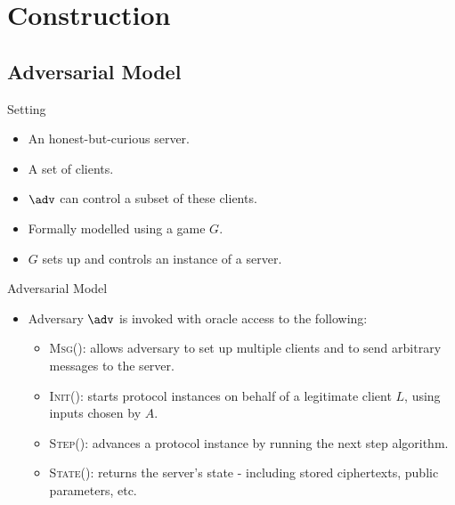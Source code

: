 \documentclass{beamer}
\begin{document}
\section{Construction}
\subsection{Adversarial Model}
\begin{frame}{Setting}
	\begin{itemize}
		\setlength\itemsep{1em}
		\item An honest-but-curious server.
		\item A set of clients.
		\item $\adv$ can control a subset of these clients.
		\item Formally modelled using a game $G$.
		\item $G$ sets up and controls an instance of a server.
		
	\end{itemize}
\end{frame}

\begin{frame}{Adversarial Model}
	\begin{itemize}
		\setlength\itemsep{1em}
        \item Adversary $\adv$ is invoked with oracle access to the following:\\
        \begin{itemize}
            \setlength\itemsep{1em}
            \item \textsc{Msg()}: allows adversary to set up multiple clients and to send arbitrary messages to the server.
            \item \textsc{Init()}: starts protocol instances on behalf of a legitimate client $L$, using inputs chosen by $A$.
            \item \textsc{Step()}: advances a  protocol instance by running the next step algorithm.
            \item \textsc{State()}: returns the server's state - including stored ciphertexts, public parameters, etc.
        \end{itemize}
    \end{itemize}
\end{frame}
\end{document}
